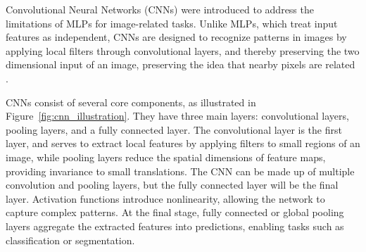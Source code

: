 
 

Convolutional Neural Networks (CNNs) \cite{lecun1995} were introduced to address the limitations of MLPs for image-related tasks. Unlike MLPs, which treat input features as independent, CNNs are designed to recognize patterns in images by applying local filters through convolutional layers, and thereby preserving the two dimensional input of an image, preserving the idea that nearby pixels are related \cite{lecun1998,NIPS2012_c399862d,zhang2023dive}. %


CNNs consist of several core components, as illustrated in Figure~\ref{fig:cnn_illustration}. They have three main layers: convolutional layers, pooling layers, and a fully connected layer. The convolutional layer is the first layer, and serves to extract local features by applying filters to small regions of an image, while pooling layers reduce the spatial dimensions of feature maps, providing invariance to small translations. The CNN can be made up of multiple convolution and pooling layers, but the fully connected layer will be the final layer. Activation functions introduce nonlinearity, allowing the network to capture complex patterns. At the final stage, fully connected or global pooling layers aggregate the extracted features into predictions, enabling tasks such as classification or segmentation.


